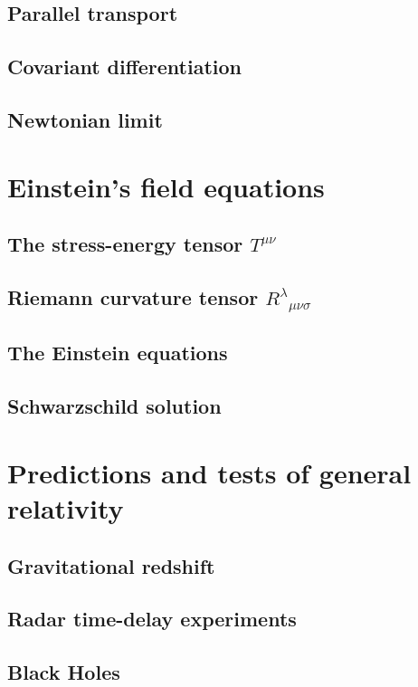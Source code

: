 \documentclass{article}
\theoremstyle{definition}
\begin{document}
\subsection{Parallel transport}
\subsection{Covariant differentiation}
\subsection{Newtonian limit}

\newpage

\section{Einstein's field equations}
\subsection{The stress-energy tensor $T^{\mu\nu}$}
\subsection{Riemann curvature tensor $R^{\lambda}_{\text{ }\mu\nu\sigma}$}
\subsection{The Einstein equations}
\subsection{Schwarzschild solution}

\newpage

\section{Predictions and tests of general relativity}
\subsection{Gravitational redshift}
\subsection{Radar time-delay experiments}
\subsection{Black Holes}
\end{document}
